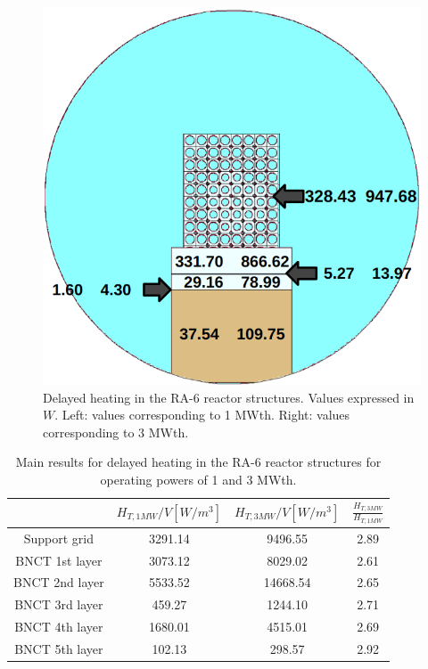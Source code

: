 \begin{figure}[htbp!] %
    \centering
    \includegraphics[width=0.75\linewidth]{figures/results_b}
    \hfill
    \caption{Delayed heating in the RA-6 reactor structures. Values expressed in $W$. Left: values corresponding to 1 MWth. Right: values corresponding to 3 MWth.}
    \label{fig:ra6-3}
\end{figure}

\begin{table}[htbp!]
  \centering
  \caption{Main results for delayed heating in the RA-6 reactor structures for operating powers of 1 and 3 MWth.}
  \label{tab:ra6-res}
  \begin{tabular}{cccc}
    \toprule
                    & $H_{T, 1MW}/V [W/m^3]$  & $H_{T, 3MW}/V [W/m^3]$  & $ \frac{H_{T, 3MW}}{H_{T, 1MW}} $  \\
    \midrule
    Support grid    &  3291.14                &  9496.55                &  2.89   \\
    BNCT 1st layer  &  3073.12                &  8029.02                &  2.61   \\
    BNCT 2nd layer  &  5533.52                & 14668.54                &  2.65   \\
    BNCT 3rd layer  &   459.27                &  1244.10                &  2.71   \\
    BNCT 4th layer  &  1680.01                &  4515.01                &  2.69   \\
    BNCT 5th layer  &   102.13                &  298.57                 &  2.92   \\
    \bottomrule
  \end{tabular}
\end{table}


